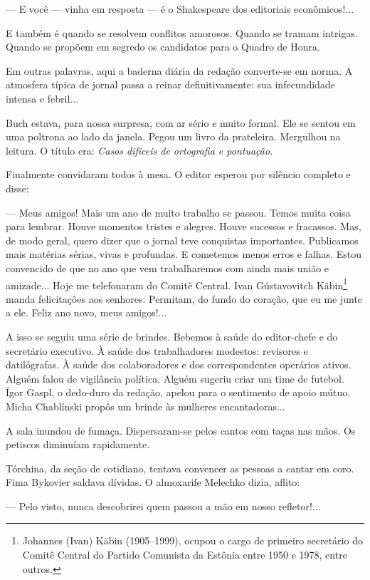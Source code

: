 --- E você --- vinha em resposta --- é o Shakespeare dos editoriais
econômicos!...

E também é quando se resolvem conflitos amorosos. Quando se tramam
intrigas. Quando se propõem em segredo os candidatos para o Quadro de
Honra.

Em outras palavras, aqui a baderna diária da redação converte-se em
norma. A atmosfera típica de jornal passa a reinar definitivamente: sua
infecundidade intensa e febril...

Buch estava, para nossa surpresa, com ar sério e muito formal. Ele se
sentou em uma poltrona ao lado da janela. Pegou um livro da prateleira.
Mergulhou na leitura. O título era: \emph{Casos difíceis de ortografia e
pontuação}.

Finalmente convidaram todos à mesa. O editor esperou por silêncio
completo e disse:

--- Meus amigos! Mais um ano de muito trabalho se passou. Temos muita
coisa para lembrar. Houve momentos tristes e alegres. Houve sucessos e
fracassos. Mas, de modo geral, quero dizer que o jornal teve conquistas
importantes. Publicamos mais matérias sérias, vivas e profundas. E
cometemos menos erros e falhas. Estou convencido de que no ano que vem
trabalharemos com ainda mais união e amizade... Hoje me telefonaram do
Comitê Central. Ivan Gústavovitch Käbin\footnote{Johannes (Ivan) Käbin
  (1905--1999), ocupou o cargo de primeiro secretário do Comitê Central
  do Partido Comunista da Estônia entre 1950 e 1978, entre outros.}
manda felicitações aos senhores. Permitam, do fundo do coração, que eu
me junte a ele. Feliz ano novo, meus amigos!...

A isso se seguiu uma série de brindes. Bebemos à saúde do editor-chefe e
do secretário executivo. À saúde dos trabalhadores modestos: revisores e
datilógrafas. À saúde dos colaboradores e dos correspondentes operários
ativos. Alguém falou de vigilância política. Alguém sugeriu criar um
time de futebol. Ígor Gaspl, o dedo-duro da redação, apelou para o
sentimento de apoio mútuo. Micha Chablínski propôs um brinde às mulheres
encantadoras...

A sala inundou de fumaça. Dispersaram-se pelos cantos com taças nas
mãos. Os petiscos diminuíam rapidamente.

Tórchina, da seção de cotidiano, tentava convencer as pessoas a cantar
em coro. Fima Bykovier saldava dívidas. O almoxarife Melechko dizia,
aflito:

--- Pelo visto, nunca descobrirei quem passou a mão em nosso
refletor!...

